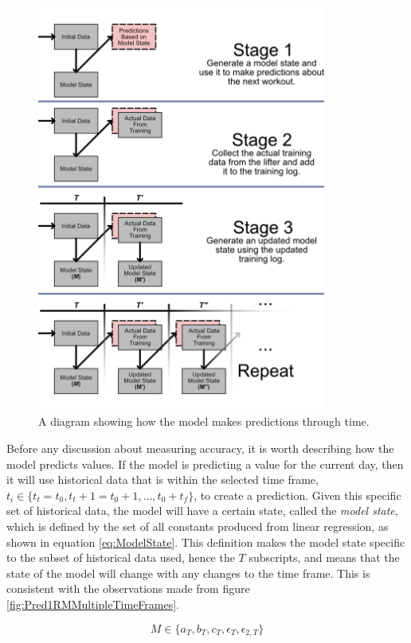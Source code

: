 \begin{figure}\centering
    \includegraphics[width=95mm]{Diagrams/PredictionsDiagram.png}
    \caption{A diagram showing how the model makes predictions through time.}
    \label{fig:ModelPredictionsDiagram}
\end{figure}

Before any discussion about measuring accuracy, it is worth describing how the model predicts values. If the model is predicting a value for the current day, then it will use historical data that is within the selected time frame, $t_i\in\{ t_t=t_0, t_t+1=t_0+1, \dots, t_0+t_f \}$, to create a prediction. Given this specific set of historical data, the model will have a certain state, called the \textit{model state}, which is defined by the set of all constants produced from linear regression, as shown in equation \ref{eq:ModelState}. This definition makes the model state specific to the subset of historical data used, hence the $T$ subscripts, and means that the state of the model will change with any changes to the time frame. This is consistent with the observations made from figure \ref{fig:Pred1RMMultipleTimeFrames}.

\begin{equation}
    \label{eq:ModelState}
    M\in \{ a_{T}, b_{T}, c_{T}, \epsilon_{T}, \epsilon_{2,T} \}
\end{equation}

